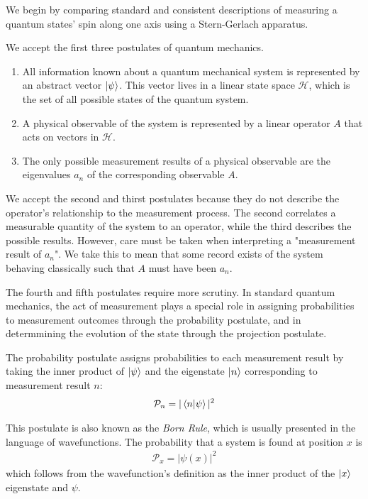 We begin by comparing standard and consistent descriptions of measuring a quantum states' spin along one axis using a Stern-Gerlach apparatus.

We accept the first three postulates of quantum mechanics.

\begin{enumerate}
    \item All information known about a quantum mechanical system is represented by an abstract vector $\ket{\psi}$. This vector lives in a linear state space $\mathcal{H}$, which is the set of all possible states of the quantum system.
    \item A physical observable of the system is represented by a linear operator $A$ that acts on vectors in $\mathcal{H}$.
    \item The only possible measurement results of a physical observable are the eigenvalues $a_n$ of the corresponding observable $A$.
\end{enumerate}

We accept the second and thirst postulates because they do not describe the operator's relationship to the measurement process. The second correlates a measurable quantity of the system to an operator, while the third describes the possible results. However, care must be taken when interpreting a "measurement result of $a_n$". We take this to mean that some record exists of the system behaving classically such that $A$ must have been $a_n$.

The fourth and fifth postulates require more scrutiny. In standard quantum mechanics, the act of measurement plays a special role in assigning probabilities to measurement outcomes through the probability postulate, and in determmining the evolution of the state through the projection postulate.

The probability postulate assigns probabilities to each measurement result by taking the inner product of $\ket{\psi}$ and the eigenstate $\ket{n}$ corresponding to measurement result $n$:
\begin{align}
    \mathcal{P}_n = |\braket{n|\psi}|^2
\end{align}

This postulate is also known as the \textit{Born Rule}, which is usually presented in the language of wavefunctions. The probability that a system is found at position $x$ is
\begin{align}
    \mathcal{P}_x = |\psi(x)|^2
\end{align}
which follows from the wavefunction's definition as the inner product of the $\ket{x}$ eigenstate and $\psi$.



